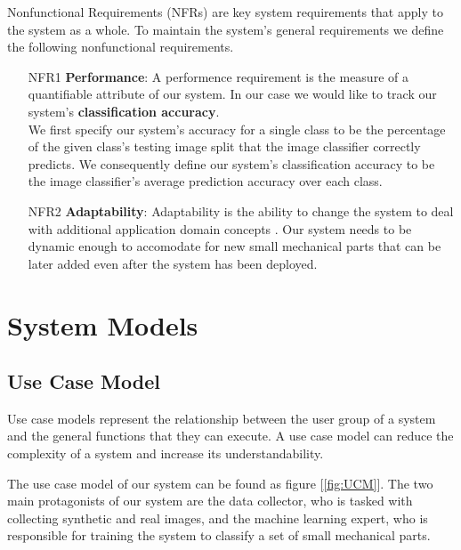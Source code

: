 \documentclass[a4paper,12pt,twoside]{report}
\begin{document}
Nonfunctional Requirements (NFRs) are key system requirements that apply to the system as a whole. To maintain the system's general requirements we define the following nonfunctional requirements.

\begin{itemize}
  \item [NFR1] \textbf{Performance}: A performence requirement is the measure of a quantifiable attribute of our system. In our case we would like to track our system's \textbf{classification accuracy}.\\
  We first specify our system's accuracy for a single class to be the percentage of the given class's testing image split that the image classifier correctly predicts. We consequently define our system's classification accuracy to be the image classifier's average prediction accuracy over each class.

  \item [NFR2] \textbf{Adaptability}: Adaptability is the ability to change the system to deal with additional application domain concepts \cite{bruegge2004object}. Our system needs to be dynamic enough to accomodate for new small mechanical parts that can be later added even after the system has been deployed.
\end{itemize}

\section{System Models}

\subsection{Use Case Model}

Use case models represent the relationship between the user group of a system and the general functions that they can execute. A use case model can reduce the complexity of a system and increase its understandability.

The use case model of our system can be found as figure [\ref{fig:UCM}]. The two main protagonists of our system are the data collector, who is tasked with collecting synthetic and real images, and the machine learning expert, who is responsible for training the system to classify a set of small mechanical parts.
\end{document}

